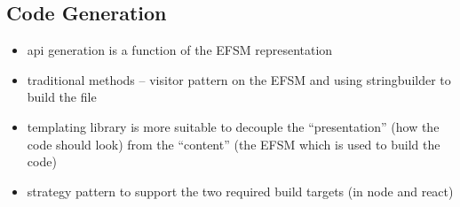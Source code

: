 \subsection{Code Generation}
\label{subsection:apigen}

\begin{itemize}
\item api generation is a function of the EFSM representation
\item traditional methods -- visitor pattern on the EFSM and using stringbuilder to build the file
\item templating library is more suitable to decouple the ``presentation'' (how the code should look) from the ``content'' (the EFSM which is used to build the code)
\item strategy pattern to support the two required build targets (in node and react)
\end{itemize}